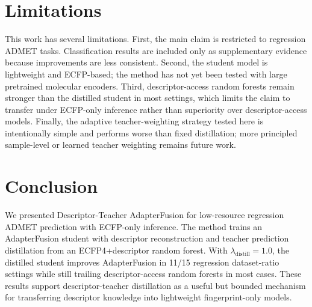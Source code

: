 \documentclass[11pt]{article}
\begin{document}
\section{Limitations}

This work has several limitations. First, the main claim is restricted to
regression ADMET tasks. Classification results are included only as
supplementary evidence because improvements are less consistent. Second, the
student model is lightweight and ECFP-based; the method has not yet been tested
with large pretrained molecular encoders. Third, descriptor-access random
forests remain stronger than the distilled student in most settings, which
limits the claim to transfer under ECFP-only inference rather than superiority
over descriptor-access models. Finally, the adaptive teacher-weighting strategy
tested here is intentionally simple and performs worse than fixed distillation;
more principled sample-level or learned teacher weighting remains future work.

\section{Conclusion}

We presented Descriptor-Teacher AdapterFusion for low-resource regression
ADMET prediction with ECFP-only inference. The method trains an AdapterFusion
student with descriptor reconstruction and teacher prediction distillation from
an ECFP4+descriptor random forest. With
$\lambda_{\mathrm{distill}}=1.0$, the distilled student improves AdapterFusion
in 11/15 regression dataset-ratio settings while still trailing
descriptor-access random forests in most cases. These results support
descriptor-teacher distillation as a useful but bounded mechanism for
transferring descriptor knowledge into lightweight fingerprint-only models.



\end{document}
